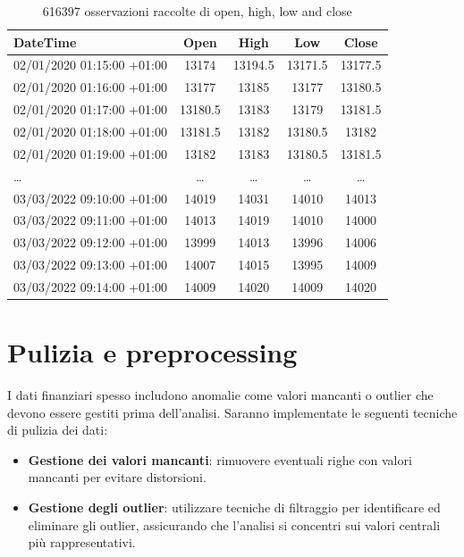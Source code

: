 \documentclass[%
	corpo=11pt,
    twoside,
    stile=classica,
    oldstyle,
    tipotesi=custom,
    greek,
    evenboxes,
]{toptesi}
\begin{document}
\begin{table}[h]
	\centering
	\renewcommand{\arraystretch}{1.2} %
	\setlength{\tabcolsep}{6pt} %
	\small %
	\begin{tabular}{lcccc} %
		\toprule
		\textbf{DateTime} & \textbf{Open} & \textbf{High} & \textbf{Low} & \textbf{Close} \\
		\midrule
		02/01/2020 01:15:00 +01:00 & 13174 & 13194.5 & 13171.5 & 13177.5 \\
		02/01/2020 01:16:00 +01:00 & 13177 & 13185 & 13177 & 13180.5 \\
		02/01/2020 01:17:00 +01:00 & 13180.5 & 13183 & 13179 & 13181.5 \\
		02/01/2020 01:18:00 +01:00 & 13181.5 & 13182 & 13180.5 & 13182 \\
		02/01/2020 01:19:00 +01:00 & 13182 & 13183 & 13180.5 & 13181.5 \\
		\midrule
		\dots & \dots & \dots & \dots & \dots \\
		\midrule
		03/03/2022 09:10:00 +01:00 & 14019 & 14031 & 14010 & 14013 \\
		03/03/2022 09:11:00 +01:00 & 14013 & 14019 & 14010 & 14000 \\
		03/03/2022 09:12:00 +01:00 & 13999 & 14013 & 13996 & 14006 \\
		03/03/2022 09:13:00 +01:00 & 14007 & 14015 & 13995 & 14009 \\
		03/03/2022 09:14:00 +01:00 & 14009 & 14020 & 14009 & 14020 \\
		\bottomrule
	\end{tabular}
	\caption{616397 osservazioni raccolte di open, high, low and close }
	\label{tab:dati_finanziari}
\end{table}

\section{Pulizia e preprocessing}

I dati finanziari spesso includono anomalie come valori mancanti o outlier che devono essere gestiti prima dell’analisi. Saranno implementate le seguenti tecniche di pulizia dei dati:

\begin{itemize}
	\item \textbf{Gestione dei valori mancanti}: rimuovere eventuali righe con valori mancanti per evitare distorsioni.
	\item \textbf{Gestione degli outlier}: utilizzare tecniche di filtraggio per identificare ed eliminare gli outlier, assicurando che l’analisi si concentri sui valori centrali più rappresentativi.
\end{itemize}
\end{document}
